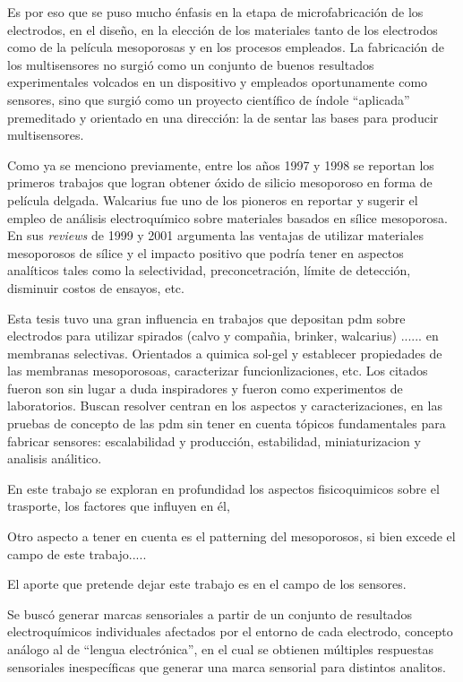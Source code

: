 	Es por eso que se puso mucho énfasis en la etapa de microfabricación de los electrodos, en el diseño, en la elección de los materiales tanto de los electrodos como de la película mesoporosas y en los procesos empleados. La fabricación de los multisensores no surgió como un conjunto de buenos resultados experimentales volcados en un dispositivo y empleados oportunamente como sensores, sino que surgió como un proyecto científico de índole ``aplicada'' premeditado y orientado en una dirección: la de sentar las bases para producir multisensores.

	Como ya se menciono previamente, entre los años 1997 y 1998 se reportan los primeros trabajos que logran obtener óxido de silicio mesoporoso en forma de película delgada. \cite{Lu1997,Zhao1998a,Zhao1998,Brinker1999}	Walcarius fue uno de los pioneros en reportar y sugerir el empleo de análisis electroquímico sobre materiales basados en sílice mesoporosa. En sus \textit{reviews} de 1999\cite{walcarius1999} y 2001\cite{walcariussss2001} argumenta las ventajas de utilizar materiales mesoporosos de sílice y el impacto positivo que podría tener en aspectos analíticos tales como la selectividad, preconcetración, límite de detección, disminuir costos de ensayos, etc. 


	Esta tesis tuvo una gran influencia en trabajos que depositan pdm sobre electrodos para utilizar spirados (calvo y compañia, brinker, walcarius) ...... en membranas selectivas. Orientados a quimica sol-gel y establecer propiedades de las membranas mesoporosoas, caracterizar funcionlizaciones, etc. Los citados fueron son sin lugar a duda inspiradores y fueron como experimentos de laboratorios. Buscan resolver  centran en los aspectos y caracterizaciones, en las pruebas de concepto de las pdm sin tener en cuenta tópicos fundamentales para fabricar sensores: escalabilidad y producción, estabilidad, miniaturizacion y analisis análitico.

	En este trabajo se exploran en profundidad los aspectos fisicoquimicos sobre el trasporte, los factores que influyen en él,  

	Otro aspecto a tener en cuenta es el patterning del mesoporosos, si bien excede el campo de este trabajo.....

	El aporte que pretende dejar este trabajo es en el campo de los sensores. 





	Se buscó generar marcas sensoriales a partir de un conjunto de resultados electroquímicos individuales afectados por el entorno de cada electrodo, concepto análogo al de ``lengua electrónica'', en el cual se obtienen múltiples respuestas sensoriales inespecíficas que generar una marca sensorial para distintos analitos.\cite{}

